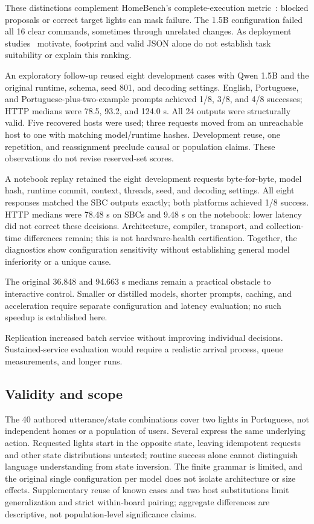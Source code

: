 \documentclass[letterpaper,conference]{IEEEtran}
\begin{document}
These distinctions complement HomeBench's complete-execution metric~\cite{homebench}: blocked proposals or correct target lights can mask failure. The 1.5B configuration failed all 16 clear commands, sometimes through unrelated changes. As deployment studies~\cite{edge,empirical} motivate, footprint and valid JSON alone do not establish task suitability or explain this ranking.

An exploratory follow-up reused eight development cases with Qwen 1.5B and the original runtime, schema, seed 801, and decoding settings. English, Portuguese, and Portuguese-plus-two-example prompts achieved 1/8, 3/8, and 4/8 successes; HTTP medians were 78.5, 93.2, and 124.0 s. All 24 outputs were structurally valid. Five recovered hosts were used; three requests moved from an unreachable host to one with matching model/runtime hashes. Development reuse, one repetition, and reassignment preclude causal or population claims. These observations do not revise reserved-set scores.

A notebook replay retained the eight development requests byte-for-byte, model hash, runtime commit, context, threads, seed, and decoding settings. All eight responses matched the SBC outputs exactly; both platforms achieved 1/8 success. HTTP medians were 78.48 s on SBCs and 9.48 s on the notebook: lower latency did not correct these decisions. Architecture, compiler, transport, and collection-time differences remain; this is not hardware-health certification. Together, the diagnostics show configuration sensitivity without establishing general model inferiority or a unique cause.

The original 36.848 and 94.663 s medians remain a practical obstacle to interactive control. Smaller or distilled models, shorter prompts, caching, and acceleration require separate configuration and latency evaluation; no such speedup is established here.

Replication increased batch service without improving individual decisions. Sustained-service evaluation would require a realistic arrival process, queue measurements, and longer runs.

\subsection{Validity and scope}
The 40 authored utterance/state combinations cover two lights in Portuguese, not independent homes or a population of users. Several express the same underlying action. Requested lights start in the opposite state, leaving idempotent requests and other state distributions untested; routine success alone cannot distinguish language understanding from state inversion. The finite grammar is limited, and the original single configuration per model does not isolate architecture or size effects. Supplementary reuse of known cases and two host substitutions limit generalization and strict within-board pairing; aggregate differences are descriptive, not population-level significance claims.
\end{document}
